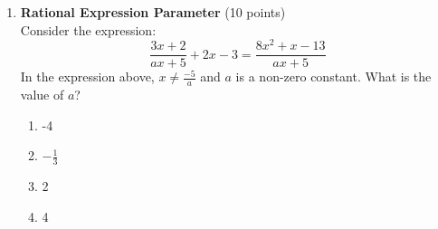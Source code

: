 \begin{enumerate}
  \item \textbf{Rational Expression Parameter} (10 points)\\
  Consider the expression:
  \[
    \frac{3 x+2}{a x+5}+2 x-3=\frac{8 x^2+x-13}{a x+5}
  \]
  In the expression above, $x \neq \frac{-5}{a}$ and $a$ is a non-zero constant. What is the value of $a$?
  \begin{enumerate}[label=(\Alph*)]
    \item -4
    \item $-\frac{1}{3}$
    \item 2
    \item 4
  \end{enumerate}
  \begin{subanswer}
  \end{subanswer}
\end{enumerate}